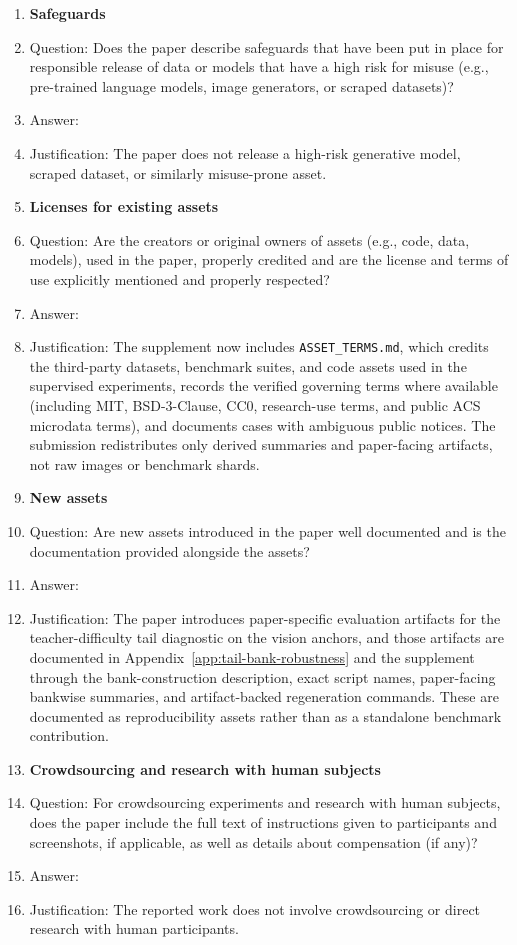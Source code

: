 \begin{enumerate}
\item {\bf Safeguards}
  \item[] Question: Does the paper describe safeguards that have been put in place for responsible release of data or models that have a high risk for misuse (e.g., pre-trained language models, image generators, or scraped datasets)?
  \item[] Answer: \answerNA{}
  \item[] Justification: The paper does not release a high-risk generative model, scraped dataset, or similarly misuse-prone asset.

\item {\bf Licenses for existing assets}
  \item[] Question: Are the creators or original owners of assets (e.g., code, data, models), used in the paper, properly credited and are the license and terms of use explicitly mentioned and properly respected?
  \item[] Answer: \answerYes{}
\item[] Justification: The supplement now includes \texttt{ASSET\_TERMS.md}, which credits the third-party datasets, benchmark suites, and code assets used in the supervised experiments, records the verified governing terms where available (including MIT, BSD-3-Clause, CC0, research-use terms, and public ACS microdata terms), and documents cases with ambiguous public notices. The submission redistributes only derived summaries and paper-facing artifacts, not raw images or benchmark shards.

\item {\bf New assets}
  \item[] Question: Are new assets introduced in the paper well documented and is the documentation provided alongside the assets?
  \item[] Answer: \answerYes{}
  \item[] Justification: The paper introduces paper-specific evaluation artifacts for the teacher-difficulty tail diagnostic on the vision anchors, and those artifacts are documented in Appendix~\ref{app:tail-bank-robustness} and the supplement through the bank-construction description, exact script names, paper-facing bankwise summaries, and artifact-backed regeneration commands. These are documented as reproducibility assets rather than as a standalone benchmark contribution.

\item {\bf Crowdsourcing and research with human subjects}
  \item[] Question: For crowdsourcing experiments and research with human subjects, does the paper include the full text of instructions given to participants and screenshots, if applicable, as well as details about compensation (if any)?
  \item[] Answer: \answerNA{}
  \item[] Justification: The reported work does not involve crowdsourcing or direct research with human participants.


\end{enumerate}
